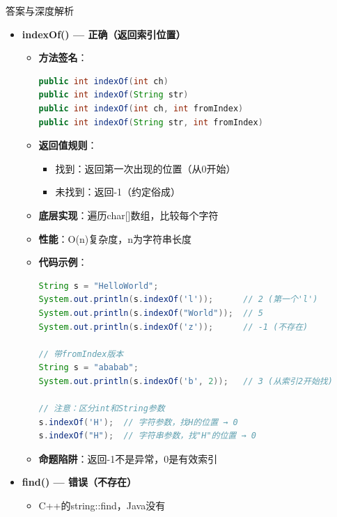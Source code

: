 \documentclass[12pt, a4paper]{ctexart}
\begin{document}
\begin{enumerate}[label=\textbf{\arabic*.}]
\begin{bluebox}{答案与深度解析}
		      \begin{itemize}[leftmargin=*, nosep, label={}]
			      \item[A] \textbf{indexOf() — 正确（返回索引位置）}
			            \begin{itemize}[label={}, leftmargin=*, nosep]
				            \item \textbf{方法签名}：
				                  \begin{lstlisting}[language=Java]
public int indexOf(int ch)
public int indexOf(String str)
public int indexOf(int ch, int fromIndex)
public int indexOf(String str, int fromIndex)
				            \end{lstlisting}
				            \item \textbf{返回值规则}：
				                  \begin{itemize}[label={}, nosep]
					                  \item 找到：返回第一次出现的位置（从0开始）
					                  \item 未找到：返回-1（约定俗成）
				                  \end{itemize}
				            \item \textbf{底层实现}：遍历char[]数组，比较每个字符
				            \item \textbf{性能}：O(n)复杂度，n为字符串长度
				            \item \textbf{代码示例}：
				                  \begin{lstlisting}[language=Java]
String s = "HelloWorld";
System.out.println(s.indexOf('l'));      // 2 (第一个'l')
System.out.println(s.indexOf("World"));  // 5
System.out.println(s.indexOf('z'));      // -1 (不存在)

// 带fromIndex版本
String s = "ababab";
System.out.println(s.indexOf('b', 2));   // 3 (从索引2开始找)

// 注意：区分int和String参数
s.indexOf('H');  // 字符参数，找H的位置 → 0
s.indexOf("H");  // 字符串参数，找"H"的位置 → 0
				            \end{lstlisting}
				            \item \textbf{命题陷阱}：返回-1不是异常，0是有效索引
			            \end{itemize}

			      \item[B] \textbf{find() — 错误（不存在）}
			            \begin{itemize}[label={}, leftmargin=*, nosep]
				            \item C++的string::find，Java没有
			            \end{itemize}


\end{itemize}
\end{bluebox}
\end{enumerate}
\end{document}
